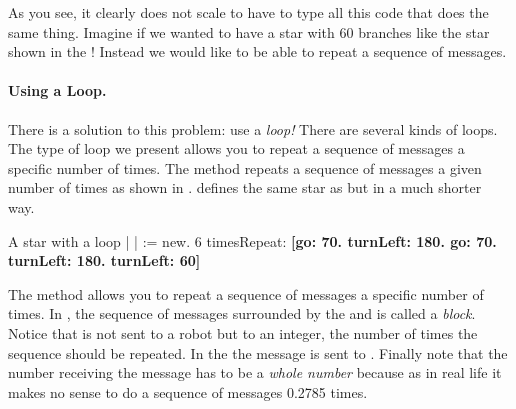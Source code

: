 As you see, \newcommand{\replace}[2]{this}{it} clearly does not scale to have to \newcommand{\add}[1]{repeatedly} type all this code that
does \newcommand{\remove}[1]{all the time} the same thing\newcommand{\add}[1]{ each time}. Imagine if we \newcommand{\replace}[2]{would like}{wanted} to have a
star with 60 branches like the star shown in the
! \newcommand{\replace}[2]{In fact}{Instead} we would like to be able to 
repeat a sequence of messages.

\paragraph{Using a  Loop.} There is a solution to this problem: use a \emph{loop!} There are \newcommand{\replace}[2]{different}{several} kinds of loops. \newcommand{\replace}[2]{For the moment the}{The type of} loop we present \newcommand{\add}[1]{in this chapter} allows you to repeat \newcommand{\replace}[2]{a given}{a} sequence of messages a \newcommand{\replace}[2]{given}{specific} number of times. The method \timesRepeat  {} repeats a sequence of  messages a given number of times as shown in \newcommand{\remove}[1]{the} . \newcommand{\replace}[2]{The}{\n
}
 defines the same star \newcommand{\replace}[2]{than}{as} \newcommand{\remove}[1]{the}  but in a much shorter way. 

\begin{scriptwithtitle}{A star with a loop}\label{scr:starloop}
| \caro |
\caro := \Turtle new.
6 timesRepeat: 
     \textbf{\textbf{[}\caro go: 70.
     \caro turnLeft: 180.
     \caro go: 70.
     \caro turnLeft: 180.
     \caro turnLeft: 60\textbf{]}}
\end{scriptwithtitle} 



The method \timesRepeat allows you to repeat a sequence of messages a \newcommand{\replace}[2]{given}{specific} number of times. In \sq\newcommand{\replace}[2]{ such a}{, the} sequence of messages \newcommand{\replace}[2]{delimited by}{surrounded by the} \ct{[} and \ct{]} is called a \emph{block}. \newcommand{\add}[1]{\paragraph
}
\newcommand{\replace}[2]{Another interesting point is}{Notice} that \timesRepeat is not sent to a robot but to an integer, the number of times the sequence should be repeated. In the
 the message \timesRepeat \ct{[...]} is sent
to . \newcommand{\add}[1]{\paragraph
}
Finally note that the number receiving the message \timesRepeat has to be  a \emph{whole number}  because as in real life \newcommand{\replace}[2]{there is}{it makes} no sense to do a sequence of 
messages 0.2785 times.

